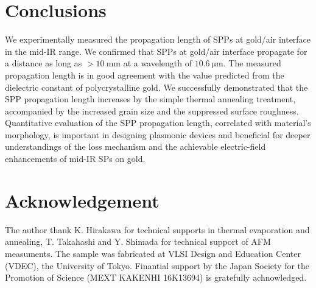 \documentclass[aip,apl,reprint]{revtex4-1}
\begin{document}
\section{Conclusions}
\label{sec:conclusion}
We experimentally measured the propagation length of SPPs at gold/air interface in the mid-IR range. We confirmed that SPPs at gold/air interface propagate for a distance as long as $>10\:\mathrm{mm}$ at a wavelength of $10.6\:\mathrm{\mu m}$. The measured propagation length is in good agreement with the value predicted from the dielectric constant of polycrystalline gold. We successfully demonstrated that the SPP propagation length increases by the simple thermal annealing treatment, accompanied by the increased grain size and the suppressed surface roughness. Quantitative evaluation of the SPP propagation length, correlated with material's morphology, is important in designing plasmonic devices and beneficial for deeper understandings of the loss mechanism and the achievable electric-field enhancements of mid-IR SPs on gold.

\section*{Acknowledgement}
The author thank K. Hirakawa for technical supports in thermal evaporation and annealing, T. Takahashi and Y. Shimada for  technical support of AFM measuments.
The sample was fabricated at VLSI Design and Education Center (VDEC), the University of Tokyo. Finantial support by the Japan Society for the Promotion of Science (MEXT KAKENHI 16K13694) is gratefully achnowledged.



\newpage
\end{document}
